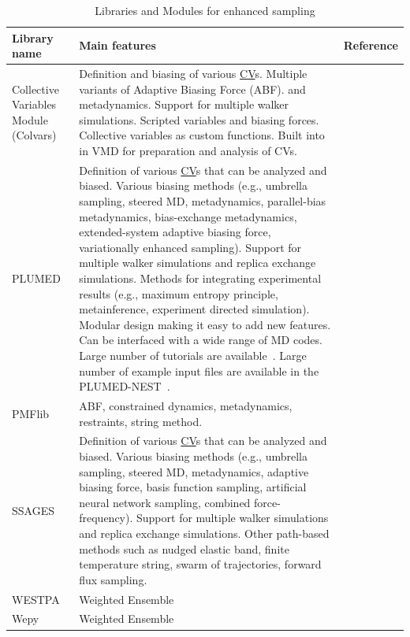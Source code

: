 \documentclass[9pt,review]{livecoms}
\begin{document}
\begin{table}[!ht]
\caption {Libraries and Modules for enhanced sampling}
\label{Table:Libraries}
\begin{tabularx}{0.95\textwidth}{
  || >{\raggedright\arraybackslash}l
  || >{\raggedright\arraybackslash}X
  | >{\raggedright\arraybackslash}l ||}
\hline
  Library name  & Main features                         & Reference \\
\hline
\hline
  Collective Variables Module (Colvars) & Definition and biasing of various \hyperlink{ref:CV} {CV}s.
  Multiple variants of Adaptive Biasing Force (ABF). and metadynamics. Support for multiple walker simulations. Scripted variables and biasing forces. Collective variables as custom functions.
  Built into in VMD for preparation and analysis of CVs. & \cite{Fiorin2013, Henin2022dashboard}\\
\hline
PLUMED        &  Definition of various \hyperlink{ref:CV} {CV}s that can be analyzed and biased. Various biasing methods (e.g., umbrella sampling, steered MD, metadynamics, parallel-bias metadynamics, bias-exchange metadynamics, extended-system adaptive biasing force, variationally enhanced sampling). Support for multiple walker simulations and replica exchange simulations. Methods for integrating experimental results (e.g., maximum entropy principle, metainference, experiment directed simulation). Modular design making it easy to add new features. Can be interfaced with a wide range of MD codes. Large number of tutorials are available~\cite{plumed_masterclass}. Large number of example input files are available in the PLUMED-NEST~\cite{plumed_nest_url}.         &  \cite{Bonomi-CPC-2009,Tribello2014,plumed-nest} \\
\hline
PMFlib        &  ABF, constrained dynamics, metadynamics, restraints, string method. &  \cite{kulhanek2011pmflib} \\
\hline
SSAGES & Definition of various \hyperlink{ref:CV} {CV}s that can be analyzed and biased. Various biasing methods (e.g., umbrella sampling, steered MD, metadynamics, adaptive biasing force, basis function sampling, artificial neural network sampling, combined force-frequency). Support for multiple walker simulations and replica exchange simulations. Other path-based methods such as nudged elastic band, finite temperature string, swarm of trajectories, forward flux sampling. & \cite{Sidky2018} \\
\hline
WESTPA        &   Weighted Ensemble     & \cite{Bogetti2019Suite, Russo_2022}  \\
\hline
Wepy          &  Weighted Ensemble  & \cite{samuel_d_lotz_2020_4270219} \\
\hline
\end{tabularx}
\end{table}
\end{document}
